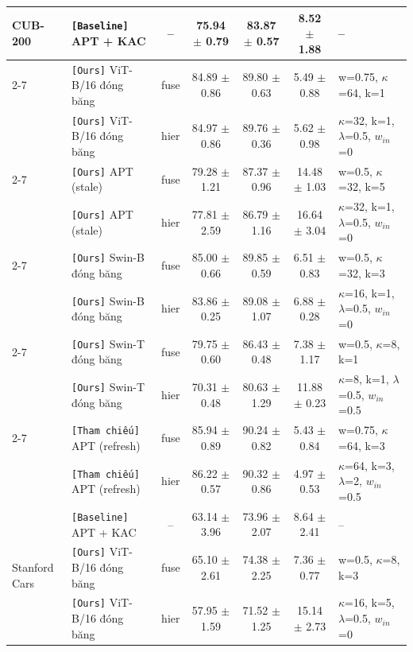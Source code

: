 \documentclass[10pt,a4paper]{article}
\newcommand{\src}[1]{\texttt{[#1]}}
\begin{document}
{\begin{longtable}{llcccc l}
\midrule
\multirow{11}{*}{CUB-200} & \src{Baseline} APT + KAC & -- & 75.94 $\pm$ 0.79 & 83.87 $\pm$ 0.57 & 8.52 $\pm$ 1.88 & {\scriptsize --} \\
\cmidrule(l){2-7}
 & \src{Ours} ViT-B/16 đóng băng & fuse & 84.89 $\pm$ 0.86 & 89.80 $\pm$ 0.63 & 5.49 $\pm$ 0.88 & {\scriptsize w=0.75, $\kappa$=64, k=1} \\
 & \src{Ours} ViT-B/16 đóng băng & hier & 84.97 $\pm$ 0.86 & 89.76 $\pm$ 0.36 & 5.62 $\pm$ 0.98 & {\scriptsize $\kappa$=32, k=1, $\lambda$=0.5, $w_{in}$=0} \\
\cmidrule(l){2-7}
 & \src{Ours} APT (stale) & fuse & 79.28 $\pm$ 1.21 & 87.37 $\pm$ 0.96 & 14.48 $\pm$ 1.03 & {\scriptsize w=0.5, $\kappa$=32, k=5} \\
 & \src{Ours} APT (stale) & hier & 77.81 $\pm$ 2.59 & 86.79 $\pm$ 1.16 & 16.64 $\pm$ 3.04 & {\scriptsize $\kappa$=32, k=1, $\lambda$=0.5, $w_{in}$=0} \\
\cmidrule(l){2-7}
 & \src{Ours} Swin-B đóng băng & fuse & 85.00 $\pm$ 0.66 & 89.85 $\pm$ 0.59 & 6.51 $\pm$ 0.83 & {\scriptsize w=0.5, $\kappa$=32, k=3} \\
 & \src{Ours} Swin-B đóng băng & hier & 83.86 $\pm$ 0.25 & 89.08 $\pm$ 1.07 & 6.88 $\pm$ 0.28 & {\scriptsize $\kappa$=16, k=1, $\lambda$=0.5, $w_{in}$=0} \\
\cmidrule(l){2-7}
 & \src{Ours} Swin-T đóng băng & fuse & 79.75 $\pm$ 0.60 & 86.43 $\pm$ 0.48 & 7.38 $\pm$ 1.17 & {\scriptsize w=0.5, $\kappa$=8, k=1} \\
 & \src{Ours} Swin-T đóng băng & hier & 70.31 $\pm$ 0.48 & 80.63 $\pm$ 1.29 & 11.88 $\pm$ 0.23 & {\scriptsize $\kappa$=8, k=1, $\lambda$=0.5, $w_{in}$=0.5} \\
\cmidrule(l){2-7}
 & \src{Tham chiếu} APT (refresh) & fuse & 85.94 $\pm$ 0.89 & 90.24 $\pm$ 0.82 & 5.43 $\pm$ 0.84 & {\scriptsize w=0.75, $\kappa$=64, k=3} \\
 & \src{Tham chiếu} APT (refresh) & hier & 86.22 $\pm$ 0.57 & 90.32 $\pm$ 0.86 & 4.97 $\pm$ 0.53 & {\scriptsize $\kappa$=64, k=3, $\lambda$=2, $w_{in}$=0.5} \\
\midrule
\multirow{11}{*}{Stanford Cars} & \src{Baseline} APT + KAC & -- & 63.14 $\pm$ 3.96 & 73.96 $\pm$ 2.07 & 8.64 $\pm$ 2.41 & {\scriptsize --} \\
\cmidrule(l){2-7}
 & \src{Ours} ViT-B/16 đóng băng & fuse & 65.10 $\pm$ 2.61 & 74.38 $\pm$ 2.25 & 7.36 $\pm$ 0.77 & {\scriptsize w=0.5, $\kappa$=8, k=3} \\
 & \src{Ours} ViT-B/16 đóng băng & hier & 57.95 $\pm$ 1.59 & 71.52 $\pm$ 1.25 & 15.14 $\pm$ 2.73 & {\scriptsize $\kappa$=16, k=5, $\lambda$=0.5, $w_{in}$=0} \\

\end{longtable}}
\end{document}
